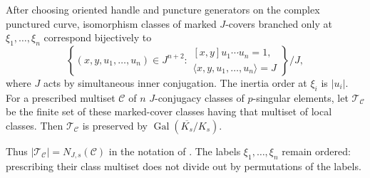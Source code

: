 \begin{lemma}\label{lem:marked-cover-classification}
After choosing oriented handle and puncture generators on the complex
punctured curve, isomorphism classes of marked $J$-covers branched only at
$\xi_1,\ldots,\xi_n$ correspond bijectively to
\[
 \left\{(x,y,u_1,\ldots,u_n)\in J^{n+2}:
 \begin{array}{l}
 [x,y]u_1\cdots u_n=1,\\
 \langle x,y,u_1,\ldots,u_n\rangle=J
 \end{array}\right\}/J,
\]
where $J$ acts by simultaneous inner conjugation.
The inertia order at $\xi_i$ is $|u_i|$.
For a prescribed multiset $\mathcal C$ of $n$ $J$-conjugacy classes of
$p$-singular elements, let $\mathcal T_{\mathcal C}$ be the finite set
of these marked-cover classes having that multiset of local classes.
Then $\mathcal T_{\mathcal C}$ is preserved by
$\operatorname{Gal}(\overline{K_s}/K_s)$.
\end{lemma}

Thus $|\mathcal T_{\mathcal C}|=N_{J,s}(\mathcal C)$ in the notation
of . The labels $\xi_1,\ldots,\xi_n$
remain ordered: prescribing their class multiset does not divide out
by permutations of the labels.

